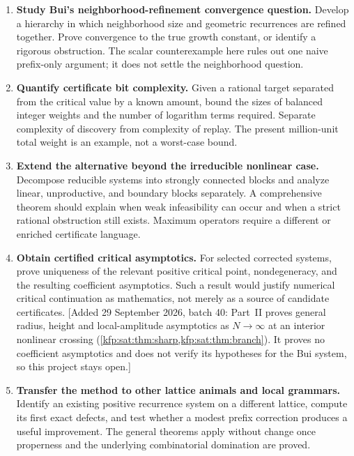 \documentclass[11pt,a4paper]{article}
\theoremstyle{definition}
\theoremstyle{remark}
\begin{document}
\begin{enumerate}[label=\textbf{\arabic*.},leftmargin=2em]
\item \textbf{Study Bui's neighborhood-refinement convergence question.}
Develop a hierarchy in which neighborhood size and geometric recurrences
are refined together. Prove convergence to the true growth constant, or
identify a rigorous obstruction. The scalar counterexample here rules out
one naive prefix-only argument; it does not settle the neighborhood question.

\item \textbf{Quantify certificate bit complexity.}
Given a rational target separated from the critical value by a known amount,
bound the sizes of balanced integer weights and the number of logarithm
terms required. Separate complexity of discovery from complexity of replay.
The present million-unit total weight is an example, not a worst-case bound.

\item \textbf{Extend the alternative beyond the irreducible nonlinear case.}
Decompose reducible systems into strongly connected blocks and analyze
linear, unproductive, and boundary blocks separately. A comprehensive theorem
should explain when weak infeasibility can occur and when a strict rational
obstruction still exists. Maximum operators require a different or enriched
certificate language.

\item \textbf{Obtain certified critical asymptotics.}
For selected corrected systems, prove uniqueness of the relevant positive
critical point, nondegeneracy, and the resulting coefficient asymptotics.
Such a result would justify numerical critical continuation as mathematics,
not merely as a source of candidate certificates.
[Added 29 September 2026, batch 40: Part~II proves general radius, height
and local-amplitude asymptotics as $N\to\infty$ at an interior nonlinear
crossing (\cref{kfp:sat:thm:sharp,kfp:sat:thm:branch}). It proves no
coefficient asymptotics and does not verify its hypotheses for the Bui
system, so this project stays open.]

\item \textbf{Transfer the method to other lattice animals and local grammars.}
Identify an existing positive recurrence system on a different lattice,
compute its first exact defects, and test whether a modest prefix correction
produces a useful improvement. The general theorems apply without change
once properness and the underlying combinatorial domination are proved.
\end{enumerate}
\end{document}
